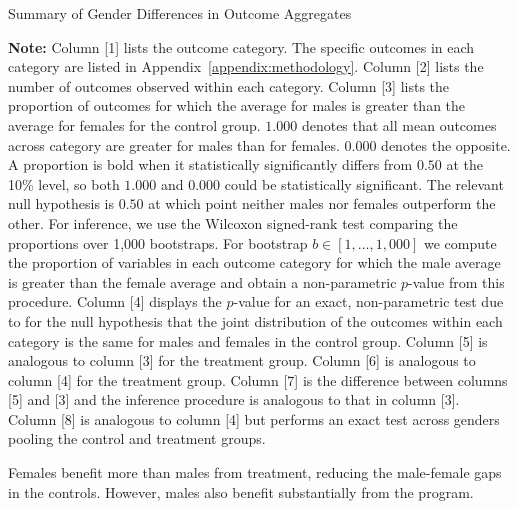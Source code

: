 \begin{sidewaystable}[!htbp]
\centering
\footnotesize
\begin{threeparttable}
\caption{Summary of Gender Differences in Outcome Aggregates} \label{table:summary}
 \label{tab:proportion-table-ranksign}
 
 \begin{tablenotes}
 \footnotesize
\item \textbf{Note:} Column [1] lists the outcome category. The specific outcomes in each category are listed in Appendix~\ref{appendix:methodology}. Column [2] lists the number of outcomes observed within each category. Column [3] lists the proportion of outcomes for which the average for males is greater than the average for females for the control group. $1.000$ denotes that all mean outcomes across category are greater for males than for females. $0.000$ denotes the opposite. A proportion is bold when it statistically significantly differs from $0.50$ at the 10\% level, so both $1.000$ and $0.000$ could be statistically significant. The relevant null hypothesis is $0.50$ at which point neither males nor females outperform the other. For inference, we use the Wilcoxon signed-rank test comparing the proportions over 1,000 bootstraps. For bootstrap $b \in [1, \ldots, 1,000]$ we compute the proportion of variables in each outcome category for which the male average is greater than the female average and obtain a non-parametric $p$-value from this procedure. Column [4] displays the $p$-value for an exact, non-parametric test due to \cite{Rosenbaum_2005_Distribution_JRSS} for the null hypothesis that the joint distribution of the outcomes within each category is the same for males and females in the control group. Column [5] is analogous to column [3] for the treatment group. Column [6] is analogous to column [4] for the treatment group. Column [7] is the difference between columns [5] and [3] and the inference procedure is analogous to that in column [3]. Column [8] is analogous to column [4] but performs an exact test across genders pooling the control and treatment groups.
\end{tablenotes}
\end{threeparttable}
\end{sidewaystable}

Females benefit more than males from treatment, reducing the male-female gaps in the controls. However, males also benefit substantially from the program.

